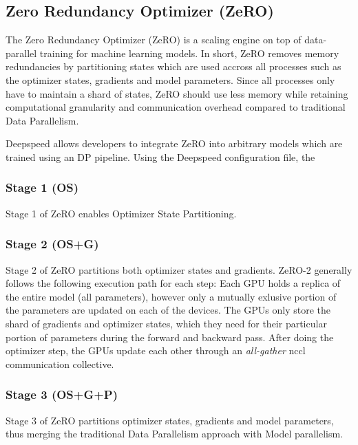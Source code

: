 \subsection{Zero Redundancy Optimizer (ZeRO)}
\label{subsection:zero}

The Zero Redundancy Optimizer (ZeRO) is a scaling engine on top of data-parallel training for 
machine learning models. In short, ZeRO removes memory redundancies by partitioning states which 
are used accross all processes such as the optimizer states, gradients and model parameters. 
Since all processes only have to maintain a shard of states, ZeRO should use less memory while 
retaining computational granularity and communication overhead compared to traditional Data 
Parallelism.

Deepspeed allows developers to integrate ZeRO into arbitrary models which are trained using an 
DP pipeline. Using the Deepspeed configuration file, the 

\subsubsection{Stage 1 (OS)}

Stage 1 of ZeRO enables Optimizer State Partitioning. 

\subsubsection{Stage 2 (OS+G)}

Stage 2 of ZeRO partitions both optimizer states and gradients. ZeRO-2 generally follows the following 
execution path for each step: Each GPU holds a replica of the entire model (all parameters), however 
only a mutually exlusive portion of the parameters are updated on each of the devices. The GPUs only store 
the shard of gradients and optimizer states, which they need for their particular portion of parameters 
during the forward and backward pass. After doing the optimizer step, the GPUs update each other through 
an \textit{all-gather} nccl communication collective. 

\subsubsection{Stage 3 (OS+G+P)}

Stage 3 of ZeRO partitions optimizer states, gradients and model parameters, thus merging the 
traditional Data Parallelism approach with Model parallelism.

